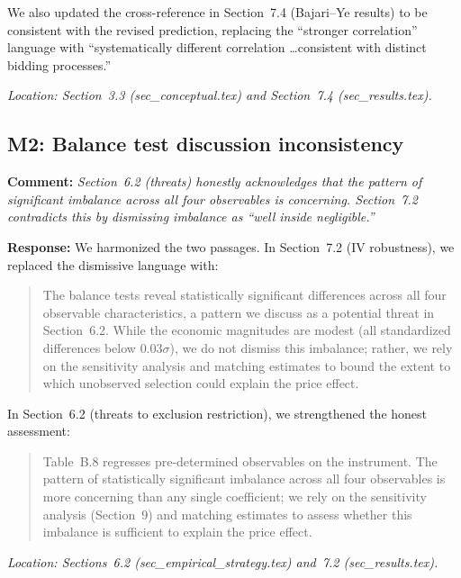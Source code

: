 \documentclass[12pt]{article}
\newcommand{\referee}[1]{\medskip\noindent\textbf{Comment:} \textit{#1}\medskip}
\newcommand{\response}[1]{\noindent\textbf{Response:} #1}
\begin{document}
\noindent We also updated the cross-reference in Section~7.4 (Bajari--Ye
results) to be consistent with the revised prediction, replacing the
``stronger correlation'' language with ``systematically different
correlation \ldots consistent with distinct bidding processes.''

\noindent\textit{Location: Section~3.3 (sec\_conceptual.tex) and
Section~7.4 (sec\_results.tex).}

\subsection*{M2: Balance test discussion inconsistency}

\referee{Section~6.2 (threats) honestly acknowledges that the pattern of
significant imbalance across all four observables is concerning. Section~7.2
contradicts this by dismissing imbalance as ``well inside negligible.''}

\response{We harmonized the two passages. In Section~7.2 (IV robustness),
we replaced the dismissive language with:}

\begin{quote}
The balance tests reveal statistically significant differences across all
four observable characteristics, a pattern we discuss as a potential
threat in Section~6.2. While the economic magnitudes are modest (all
standardized differences below $0.03\sigma$), we do not dismiss this
imbalance; rather, we rely on the sensitivity analysis and matching
estimates to bound the extent to which unobserved selection could explain
the price effect.
\end{quote}

\noindent In Section~6.2 (threats to exclusion restriction), we
strengthened the honest assessment:

\begin{quote}
Table~B.8 regresses pre-determined observables on the instrument. The
pattern of statistically significant imbalance across all four
observables is more concerning than any single coefficient; we rely on
the sensitivity analysis (Section~9) and matching estimates to assess
whether this imbalance is sufficient to explain the price effect.
\end{quote}

\noindent\textit{Location: Sections~6.2 (sec\_empirical\_strategy.tex)
and~7.2 (sec\_results.tex).}

\end{document}
